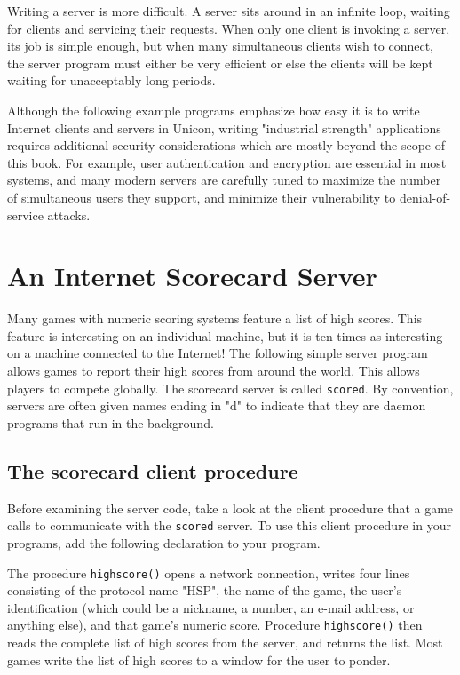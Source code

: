 Writing a server is more difficult. A server sits around in
an infinite loop, waiting for clients and servicing their requests.
When only one client is invoking a server, its job is simple enough,
but when many simultaneous clients wish to connect, the server program
must either be very efficient or else the clients will be kept waiting
for unacceptably long periods.

Although the following example programs emphasize how easy it is to
write Internet clients and servers in Unicon, writing
"industrial strength" applications requires
additional security considerations which are mostly beyond the scope of
this book. For example, user authentication and encryption are
essential in most systems, and many modern servers are carefully tuned
to maximize the number of simultaneous users they support, and minimize
their vulnerability to denial-of-service attacks.

\section{An Internet Scorecard Server}

Many games with numeric scoring systems feature a list of high scores.
This feature is interesting on an individual machine, but it is ten
times as interesting on a machine connected to the Internet! The
following simple server program allows games to report
their high scores from around the world. This allows players to compete
globally. The scorecard server is called \texttt{scored}. By
convention, servers are often given names ending in
"d" to indicate that they are daemon
programs that run in the background.

\subsection*{The scorecard client procedure}

Before examining the server code, take a look at the client procedure
that a game calls to communicate with the \texttt{scored} server. To
use this client procedure in your programs, add the following
declaration to your program.


The procedure \texttt{highscore()} opens a network connection, writes
four lines consisting of the protocol name
"HSP", the name of the game, the
user's identification (which could be a nickname, a
number, an e-mail address, or anything else), and that
game's numeric score. Procedure \texttt{highscore()}
then reads the complete list of high scores from the server, and
returns the list. Most games write the list of high scores to a window
for the user to ponder.

